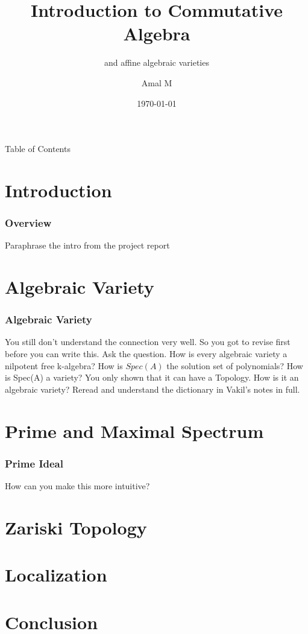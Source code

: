 \documentclass[pdf]{beamer}
\title{Introduction to Commutative Algebra}
\subtitle{and affine algebraic varieties}
\author{Amal M}
\date{\today}
\begin{document}

\begin{frame}
    \thispagestyle{empty}
    \titlepage
\end{frame}
\addtocounter{framenumber}{-1}

\begin{frame}{Table of Contents}
    \tableofcontents
\end{frame}


\section{Introduction}

\begin{frame}
    \frametitle{Overview}
    Paraphrase the intro from the project report
\end{frame}

\section{Algebraic Variety}

\begin{frame}
    \frametitle{Algebraic Variety}
    You still don't understand the connection very well. So you got to revise first before you can write this.
    Ask the question. How is every algebraic variety a nilpotent free k-algebra? How is $Spec(A)$ the solution set of polynomials?
    How is Spec(A) a variety? You only shown that it can have a Topology. How is it an algebraic variety? 
    Reread and understand the dictionary in Vakil's notes in full.
\end{frame}

\section{Prime and Maximal Spectrum}

\begin{frame}
    \frametitle{Prime Ideal}
    How can you make this more intuitive?
\end{frame}

\section{Zariski Topology}
\section{Localization}
\section{Conclusion}
\end{document}
